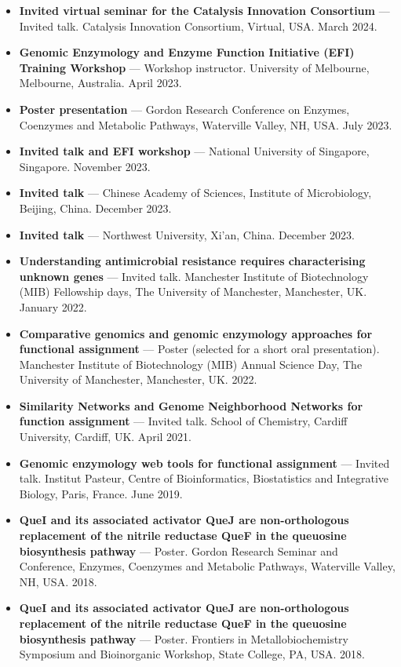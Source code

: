 \documentclass[10pt,a4paper]{article}
\begin{document}
\begin{itemize}[leftmargin=1.1em]
\item \textbf{Invited virtual seminar for the Catalysis Innovation Consortium} --- Invited talk. Catalysis Innovation Consortium, Virtual, USA. March 2024.
\item \textbf{Genomic Enzymology and Enzyme Function Initiative (EFI) Training Workshop} --- Workshop instructor. University of Melbourne, Melbourne, Australia. April 2023.
\item \textbf{Poster presentation} --- Gordon Research Conference on Enzymes, Coenzymes and Metabolic Pathways, Waterville Valley, NH, USA. July 2023.
\item \textbf{Invited talk and EFI workshop} --- National University of Singapore, Singapore. November 2023.
\item \textbf{Invited talk} --- Chinese Academy of Sciences, Institute of Microbiology, Beijing, China. December 2023.
\item \textbf{Invited talk} --- Northwest University, Xi'an, China. December 2023.
\item \textbf{Understanding antimicrobial resistance requires characterising unknown genes} --- Invited talk. Manchester Institute of Biotechnology (MIB) Fellowship days, The University of Manchester, Manchester, UK. January 2022.
\item \textbf{Comparative genomics and genomic enzymology approaches for functional assignment} --- Poster (selected for a short oral presentation). Manchester Institute of Biotechnology (MIB) Annual Science Day, The University of Manchester, Manchester, UK. 2022.
\item \textbf{Similarity Networks and Genome Neighborhood Networks for function assignment} --- Invited talk. School of Chemistry, Cardiff University, Cardiff, UK. April 2021.
\item \textbf{Genomic enzymology web tools for functional assignment} --- Invited talk. Institut Pasteur, Centre of Bioinformatics, Biostatistics and Integrative Biology, Paris, France. June 2019.
\item \textbf{QueI and its associated activator QueJ are non-orthologous replacement of the nitrile reductase QueF in the queuosine biosynthesis pathway} --- Poster. Gordon Research Seminar and Conference, Enzymes, Coenzymes and Metabolic Pathways, Waterville Valley, NH, USA. 2018.
\item \textbf{QueI and its associated activator QueJ are non-orthologous replacement of the nitrile reductase QueF in the queuosine biosynthesis pathway} --- Poster. Frontiers in Metallobiochemistry Symposium and Bioinorganic Workshop, State College, PA, USA. 2018.

\end{itemize}
\end{document}
